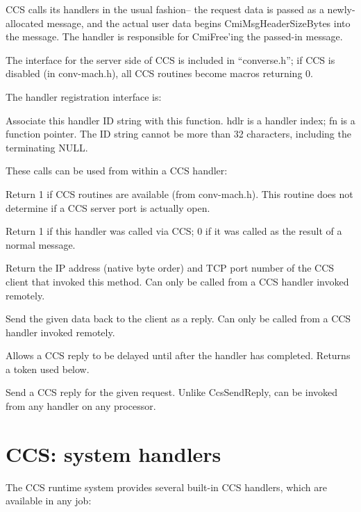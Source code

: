CCS calls its handlers in the usual \converse{} fashion--
the request data is passed as a newly-allocated message,
and the actual user data begins CmiMsgHeaderSizeBytes
into the message.  The handler is responsible for CmiFree'ing
the passed-in message.

The interface for the server side of CCS is included in 
``converse.h''; if CCS is disabled (in conv-mach.h), all
CCS routines become macros returning 0.

The handler registration interface is:

Associate this handler ID string with this function.  
hdlr is a \converse{} handler index; fn is a function pointer.
The ID string cannot be more than 32 characters, including the
terminating NULL.



These calls can be used from within a CCS handler:

Return 1 if CCS routines are available (from conv-mach.h).
This routine does not determine if a CCS server port is 
actually open.

Return 1 if this handler was called via CCS; 0 if it was
called as the result of a normal \converse{} message.

Return the IP address (native byte order) and TCP port number
of the CCS client that invoked this method.
Can only be called from a CCS handler invoked remotely.

Send the given data back to the client as a reply.
Can only be called from a CCS handler invoked remotely.

Allows a CCS reply to be delayed until after the handler
has completed.  Returns a token used below.

Send a CCS reply for the given request.  Unlike
CcsSendReply, can be invoked from any handler on any processor.


\section{CCS: system handlers}
The CCS runtime system provides several built-in CCS handlers,
which are available in any \converse{} job:

